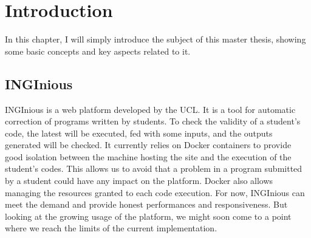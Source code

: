 \chapter{Introduction}

In this chapter, I will simply introduce the subject of this master thesis, showing some basic concepts and key aspects related to it.

\section{INGInious}

INGInious is a web platform developed by the UCL.  It is a tool for automatic correction of programs written by students. To check the validity of a student's code, the latest will be executed, fed with some inputs, and the outputs generated will be checked. It currently relies on Docker containers to provide good isolation between the machine hosting the site and the execution of the student's codes.  This allows us to avoid that a problem in a program submitted by a student could have any impact on the platform.  Docker also allows managing the resources granted to each code execution.  For now, INGInious can meet the demand and provide honest performances and responsiveness.  But looking at the growing usage of the platform, we might soon come to a point where we reach the limits of the current implementation.

